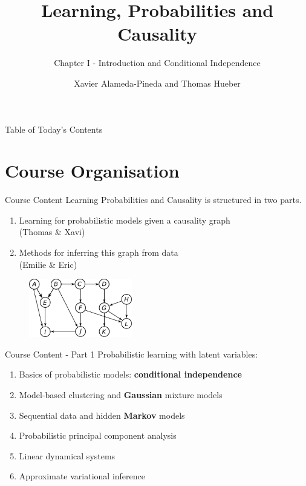 \documentclass{beamer}
\title[LPC]{Learning, Probabilities and Causality}
\subtitle{Chapter I - Introduction and Conditional Independence}
\author[Xavi and Thomas]{Xavier Alameda-Pineda and Thomas Hueber}
\institute{Ensimag/Inria/CNRS/Univ. Grenoble-Alpes}
\date{}
\begin{document}
\begin{frame}
  \titlepage
\end{frame}

\begin{frame}{Table of Today's Contents}
 \tableofcontents
\end{frame}

\section[Course Organisation]{Course Organisation}

\begin{frame}{Course Content}
Learning Probabilities and Causality is structured in two parts.
 \begin{enumerate}
  \item Learning for probabilistic models given a causality graph\\ (Thomas \& Xavi)
  \item Methods for inferring this graph from data\\ (Emilie \& Eric)
 \end{enumerate}
 \begin{figure}[H]
  \centering
  \includegraphics[width=0.4\textwidth]{fig/D-separation.pdf}
 \end{figure}

\end{frame}


\begin{frame}{Course Content - Part 1}
Probabilistic learning with latent variables:\vspace{5mm}
 \begin{enumerate}
  \item Basics of probabilistic models: {\bf conditional independence}
  \item Model-based clustering and {\bf Gaussian} mixture models
  \item Sequential data and hidden {\bf Markov} models
  \item Probabilistic principal component analysis
  \item Linear dynamical systems
  \item Approximate variational inference
 \end{enumerate}

\end{frame}
\end{document}
